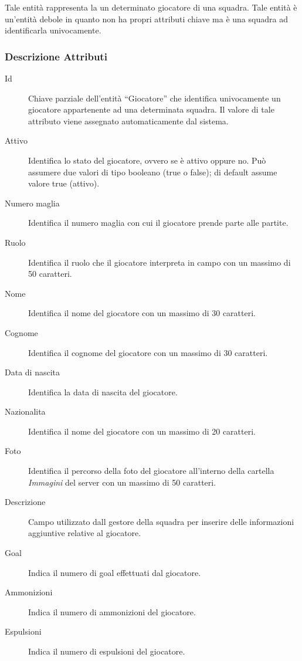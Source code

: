 		Tale entità rappresenta la un determinato giocatore di una squadra. Tale entità è un'entità debole in quanto non ha propri attributi chiave ma è una squadra ad identificarla univocamente.
		
		\subsubsection*{Descrizione Attributi}
		
		\begin{description}
			
			\item[Id]
			Chiave parziale dell'entità ``Giocatore'' che identifica univocamente un giocatore appartenente ad una determinata squadra. Il valore di tale attributo viene assegnato automaticamente dal sistema.
			
			\item[Attivo]
			Identifica lo stato del giocatore, ovvero se è attivo oppure no. Può assumere due valori di tipo booleano (true o false); di default assume valore true (attivo).
			
			\item[Numero maglia]
			Identifica il numero maglia con cui il giocatore prende parte alle partite.
			
			\item[Ruolo]
			Identifica il ruolo che il giocatore interpreta in campo con un massimo di 50 caratteri.
			
			\item[Nome]
			Identifica il nome del giocatore con un massimo di 30 caratteri.
			
			\item[Cognome]
			Identifica il cognome del giocatore con un massimo di 30 caratteri.
			
			\item[Data di nascita]
			Identifica la data di nascita del giocatore.
			
			\item[Nazionalita]
			Identifica il nome del giocatore con un massimo di 20 caratteri.
			
			\item[Foto]
			Identifica il percorso della foto del giocatore all'interno della cartella \emph{Immagini} del server con un massimo di 50 caratteri.
			
			\item[Descrizione]
			Campo utilizzato dall gestore della squadra per inserire delle informazioni aggiuntive relative al giocatore.
			
			\item[Goal]
			Indica il numero di goal effettuati dal giocatore.
			
			\item[Ammonizioni]
			Indica il numero di ammonizioni del giocatore.
			
			\item[Espulsioni]
			Indica il numero di espulsioni del giocatore.
			
		\end{description}
		
